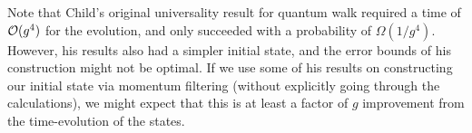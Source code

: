 \documentclass[../thesis-main/thesis-main]{subfiles}
\begin{document}
Note that Child's original universality result for quantum walk \cite{Chi09} required a time of $\mathcal{O}(g^4)$ for the evolution, and only succeeded with a probability of $\Omega(1/g^4)$.  However, his results also had a simpler initial state, and the error bounds of his construction might not be optimal.  If we use some of his results on constructing our initial state via momentum filtering (without explicitly going through the calculations), we might expect that this is at least a factor of $g$ improvement from the time-evolution of the states.


\end{document}
